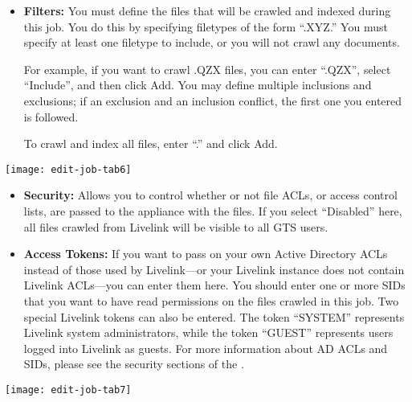 \begin{itemize}

\item \textbf{Filters:} You must define the files that will be 
crawled and indexed during this job. You do this by specifying filetypes
of the form ``\*.XYZ.'' You must specify at least one filetype to 
include, or you will not crawl any documents.

For example, if you want to crawl .QZX
files, you can enter ``\*.QZX'', select ``Include'', and then click Add.
You may define multiple inclusions and exclusions; if an exclusion and an
inclusion conflict, the first one you entered is followed.  



To crawl and index all files, enter ``\*.\*'' and click Add.

\end{itemize}

\texttt{[image: edit-job-tab6]}

\begin{itemize}

\item \textbf{Security:} Allows you to control whether or not file ACLs,
or access control lists, are passed to the appliance with the files. If
you select ``Disabled'' here, all files crawled from Livelink will be
visible to all GTS users.

\item \ifLivelinkGuide \label{ForceACL}\fi \textbf{Access Tokens:} If you want to pass on
your own Active Directory ACLs instead of those used by Livelink---or
your Livelink instance does not contain Livelink ACLs---you can enter
them here.  You should enter one or more SIDs that you want to have
read permissions on the files crawled in this job. Two special
Livelink tokens can also be entered. The token ``SYSTEM'' represents
Livelink system administrators, while the token ``GUEST'' represents
users logged into Livelink as guests. For more information about AD
ACLs and SIDs, please see the security sections of the
.


\end{itemize}

\texttt{[image: edit-job-tab7]}

